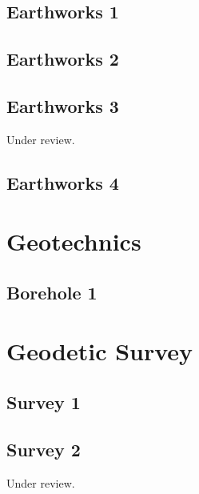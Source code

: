 \documentclass{scrartcl}
\begin{document}
\subsection{Earthworks 1}
\label{sec:earth_1}
\clearpage

\subsection{Earthworks 2}
\label{sec:earth_2}
\clearpage

\subsection{Earthworks 3}
\label{sec:earth_3}
Under review.%
\clearpage

\subsection{Earthworks 4} %
\label{sec:earth_4}
\clearpage

\section{Geotechnics}

\subsection{Borehole 1}
\label{sec:borehole_1}
\clearpage

\section{Geodetic Survey}

\subsection{Survey 1}
\label{sec:survey_1}
\clearpage

\subsection{Survey 2} %
\label{sec:survey_2}
Under review.%
\clearpage
\end{document}
